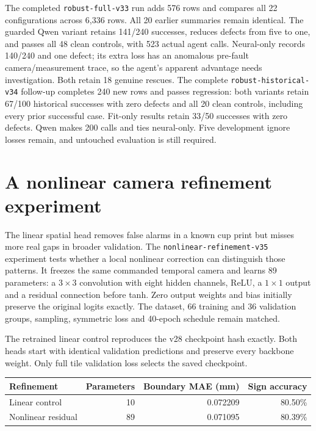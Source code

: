 \documentclass[10pt,letterpaper]{article}
\begin{document}
The completed \texttt{robust-full-v33} run adds 576 rows and compares all 22
configurations across 6,336 rows. All 20 earlier summaries remain identical.
The guarded Qwen variant retains 141/240 successes, reduces defects from five
to one, and passes all 48 clean controls, with 523 actual agent calls.
Neural-only records 140/240 and one defect; its extra loss has an anomalous
pre-fault camera/measurement trace, so the agent's apparent advantage needs
investigation. Both retain 18 genuine rescues. The complete
\texttt{robust-historical-v34} follow-up completes 240 new rows and passes regression: both variants
retain 67/100 historical successes with zero defects and all 20 clean controls,
including every prior successful case. Fit-only results retain 33/50 successes
with zero defects. Qwen makes 200 calls and ties neural-only. Five development
ignore losses remain, and untouched evaluation is still required.

\clearpage
\section{A nonlinear camera refinement experiment}

The linear spatial head removes false alarms in a known cup print but misses
more real gaps in broader validation. The \texttt{nonlinear-refinement-v35}
experiment tests whether a local nonlinear correction can distinguish those
patterns. It freezes the same commanded temporal camera and learns 89 parameters:
a $3\times3$ convolution with eight hidden channels, ReLU, a $1\times1$ output
and a residual connection before tanh. Zero output weights and bias initially
preserve the original logits exactly. The dataset, 66 training and 36 validation
groups, sampling, symmetric loss and 40-epoch schedule remain matched.

The retrained linear control reproduces the v28 checkpoint hash exactly. Both
heads start with identical validation predictions and preserve every backbone
weight. Only full tile validation loss selects the saved checkpoint.

\begin{center}
\begin{tabular}{@{}lrrr@{}}
\toprule
Refinement & Parameters & Boundary MAE (mm) & Sign accuracy \\
\midrule
Linear control & 10 & 0.072209 & 80.50\% \\
Nonlinear residual & 89 & 0.071095 & 80.39\% \\
\bottomrule
\end{tabular}
\end{center}
\end{document}
